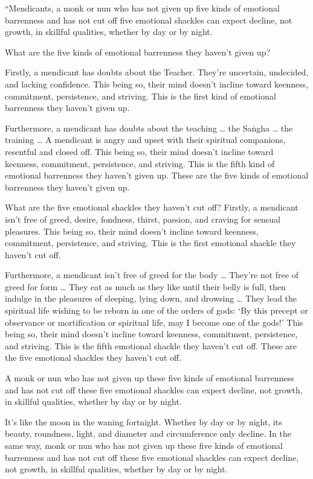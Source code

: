 \documentclass[12pt,openany]{book}%
\begin{document}
“Mendicants, a monk or nun who has not given up five kinds of emotional barrenness and has not cut off five emotional shackles can expect decline, not growth, in skillful qualities, whether by day or by night. 

What are the five kinds of emotional barrenness they haven’t given up? 

Firstly, a mendicant has doubts about the Teacher. They’re uncertain, undecided, and lacking confidence. This being so, their mind doesn’t incline toward keenness, commitment, persistence, and striving. This is the first kind of emotional barrenness they haven’t given up. 

Furthermore, a mendicant has doubts about the teaching … the \textsanskrit{Saṅgha} … the training … A mendicant is angry and upset with their spiritual companions, resentful and closed off. This being so, their mind doesn’t incline toward keenness, commitment, persistence, and striving. This is the fifth kind of emotional barrenness they haven’t given up. These are the five kinds of emotional barrenness they haven’t given up. 

What are the five emotional shackles they haven’t cut off? Firstly, a mendicant isn’t free of greed, desire, fondness, thirst, passion, and craving for sensual pleasures. This being so, their mind doesn’t incline toward keenness, commitment, persistence, and striving. This is the first emotional shackle they haven’t cut off. 

Furthermore, a mendicant isn’t free of greed for the body … They’re not free of greed for form … They eat as much as they like until their belly is full, then indulge in the pleasures of sleeping, lying down, and drowsing … They lead the spiritual life wishing to be reborn in one of the orders of gods: ‘By this precept or observance or mortification or spiritual life, may I become one of the gods!’ This being so, their mind doesn’t incline toward keenness, commitment, persistence, and striving. This is the fifth emotional shackle they haven’t cut off. These are the five emotional shackles they haven’t cut off. 

A monk or nun who has not given up these five kinds of emotional barrenness and has not cut off these five emotional shackles can expect decline, not growth, in skillful qualities, whether by day or by night. 

It’s like the moon in the waning fortnight. Whether by day or by night, its beauty, roundness, light, and diameter and circumference only decline. In the same way, monk or nun who has not given up these five kinds of emotional barrenness and has not cut off these five emotional shackles can expect decline, not growth, in skillful qualities, whether by day or by night. 
\end{document}
